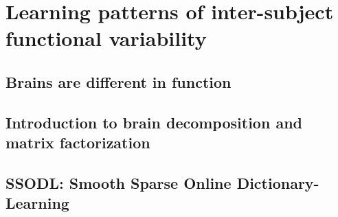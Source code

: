 


\chapter{Learning patterns of inter-subject functional variability}
\section{Brains are different in function}
\section{Introduction to brain decomposition and matrix factorization}
\section{ SSODL: Smooth Sparse Online Dictionary-Learning}




